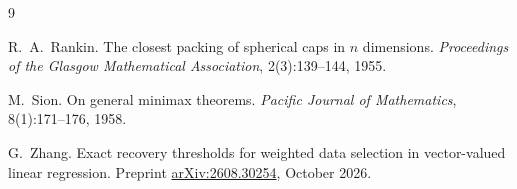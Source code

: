 \documentclass[11pt]{article}
\theoremstyle{plain}
\theoremstyle{definition}
\theoremstyle{remark}
\begin{document}
\begin{thebibliography}{9}

R.~A.~Rankin.
The closest packing of spherical caps in $n$ dimensions.
\emph{Proceedings of the Glasgow Mathematical Association}, 2(3):139--144, 1955.

M.~Sion.
On general minimax theorems.
\emph{Pacific Journal of Mathematics}, 8(1):171--176, 1958.

G.~Zhang.
Exact recovery thresholds for weighted data selection in vector-valued linear regression.
Preprint \href{https://arxiv.org/abs/2608.30254}{arXiv:2608.30254}, October 2026.

\end{thebibliography}
\end{document}
